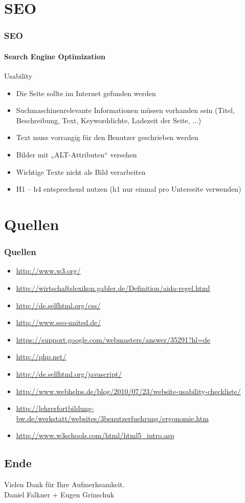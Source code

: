 \documentclass[xcolor=dvipsnames]{beamer}
\newcommand*{\Author}{Daniel Falkner + Eugen Grinschuk} %
\begin{document}
\section{SEO}
\begin{frame} %
  \frametitle{SEO} %
  \framesubtitle{Search Engine Optimization} %
  \begin{block}{Usability}
	\begin{itemize}
		\item Die Seite sollte im Internet gefunden werden
		\item Suchmaschinenrelevante Informationen müssen vorhanden sein (Titel, Beschreibung, Text, Keyworddichte, Ladezeit der Seite, ...)
		\item Text muss vorrangig für den Benutzer geschrieben werden
		\item Bilder mit „ALT-Attributen“ versehen
		\item Wichtige Texte nicht als Bild verarbeiten
		\item H1 – h4 entsprechend nutzen (h1 nur einmal pro Unterseite verwenden)
	\end{itemize}
  \end{block}
\end{frame}



\section*{Quellen}
\begin{frame} %
  \frametitle{Quellen} %
 	\begin{itemize}
		\item \url{http://www.w3.org/}
		\item \url{http://wirtschaftslexikon.gabler.de/Definition/aida-regel.html}
		\item \url{http://de.selfhtml.org/css/}
		\item \url{http://www.seo-united.de/}
		\item \url{https://support.google.com/webmasters/answer/35291?hl=de}		\item \url{http://php.net/}
 		\item \url{http://de.selfhtml.org/javascript/}
 		\item  \url{http://www.webhelps.de/blog/2010/07/23/website-usability-checkliste/}
		\item \url{http://lehrerfortbildung-bw.de/werkstatt/websites/3benutzerfuehrung/ergonomie.htm}
		\item \url{ http://www.w3schools.com/html/html5_intro.asp}
		
	\end{itemize}
 
\end{frame}

\subsection*{Ende}
\begin{frame}
	\begin{block}{}	
		\begin{center}
			Vielen Dank für Ihre Aufmerksamkeit. \\
			\Author{}
		\end{center}	
	\end{block}
\end{frame}
\end{document}

